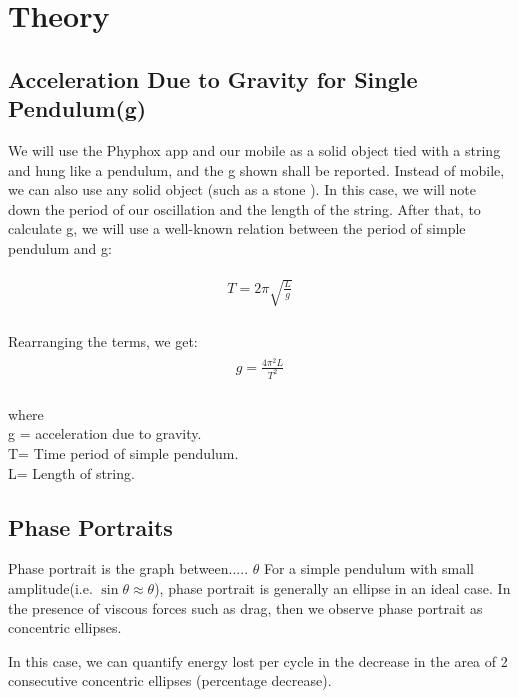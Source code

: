 \documentclass[11pt]{scrartcl} %
\begin{document}

\section{Theory}


\subsection{Acceleration Due to Gravity for Single Pendulum(g)}

We will use the Phyphox app and our mobile as a solid object tied with a string and hung like a pendulum, and the g shown shall be reported. Instead of mobile, we can also use any solid object (such as a stone ). In this case, we will note down the period of our oscillation and the length of the string. After that, to calculate g, we will use a well-known relation between the period of simple pendulum and g: \par

\begin{align} 
	\begin{split}
		T = 2\pi\sqrt{\frac{L}{g}}\\
	\end{split}					
\end{align}

Rearranging the terms, we get:
\begin{align} 
	\begin{split}
		g = \frac{4\pi^2L}{T^2}\\
	\end{split}					
\end{align}

where\\ g = acceleration due to gravity.\\ T= Time period of simple pendulum.\\ L= Length of string. \par


\subsection{Phase Portraits}
Phase portrait is the graph between..... $\theta$ For a simple pendulum with small amplitude(i.e. $\sin\theta \approx \theta$), phase portrait is generally an ellipse in an ideal case. In the presence of viscous forces such as drag, then we observe phase portrait as concentric ellipses. \par
In this case, we can quantify energy lost per cycle in the decrease in the area of 2 consecutive concentric ellipses (percentage decrease).
\end{document}
